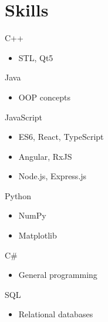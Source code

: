 \documentclass[11pt,a4paper,sans]{moderncv}			%
\begin{document}





\section{Skills}

\cvdoubleitem
{C++}{
\begin{itemize}
	\item STL, Qt5
\end{itemize}
}
{Java}{
\begin{itemize}
	\item OOP concepts
\end{itemize}
}

\cvdoubleitem
{JavaScript}{
\begin{itemize}
	\item ES6, React, TypeScript
	\item Angular, RxJS
	\item Node.js, Express.js
\end{itemize}}
{Python}{
\begin{itemize}
	\item NumPy
	\item Matplotlib
\end{itemize}
}

\cvdoubleitem
{C\#}{
\begin{itemize}
	\item General programming
\end{itemize}
}
{SQL}{
\begin{itemize}
	\item Relational databases
\end{itemize}
}
\end{document}
